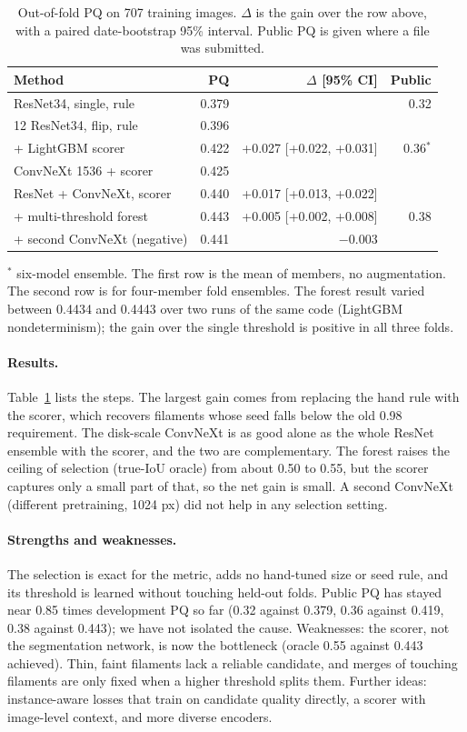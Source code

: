\begin{table}[t]
\caption{Out-of-fold PQ on 707 training images. $\Delta$ is the gain over the row above, with a
paired date-bootstrap 95\% interval. Public PQ is given where a file was submitted.}
\label{tab:results}
\small
\begin{tabular}{@{}p{3.6cm}rrr@{}}
\toprule
Method & PQ & $\Delta$ [95\% CI] & Public \\
\midrule
ResNet34, single, rule & 0.379 & & 0.32 \\
12 ResNet34, flip, rule & 0.396 & & \\
+ LightGBM scorer & 0.422 & +0.027 [+0.022, +0.031] & 0.36$^{\ast}$ \\
ConvNeXt 1536 + scorer & 0.425 & & \\
ResNet + ConvNeXt, scorer & 0.440 & +0.017 [+0.013, +0.022] & \\
+ multi-threshold forest & 0.443 & +0.005 [+0.002, +0.008] & 0.38 \\
\midrule
+ second ConvNeXt (negative) & 0.441 & $-$0.003 & \\
\bottomrule
\end{tabular}

\smallskip
{\footnotesize $^{\ast}$ six-model ensemble. The first row is the mean of members, no augmentation.
The second row is for four-member fold ensembles. The forest result varied between 0.4434 and
0.4443 over two runs of the same code (LightGBM nondeterminism); the gain over the single
threshold is positive in all three folds.}
\end{table}

\paragraph{Results.}
Table~\ref{tab:results} lists the steps. The largest gain comes from replacing the hand rule with
the scorer, which recovers filaments whose seed falls below the old 0.98 requirement. The disk-scale
ConvNeXt is as good alone as the whole ResNet ensemble with the scorer, and the two are
complementary. The forest raises the ceiling of selection (true-IoU oracle) from about 0.50 to 0.55,
but the scorer captures only a small part of that, so the net gain is small. A second ConvNeXt
(different pretraining, 1024 px) did not help in any selection setting.

\paragraph{Strengths and weaknesses.}
The selection is exact for the metric, adds no hand-tuned size or seed rule, and its threshold is
learned without touching held-out folds. Public PQ has stayed near 0.85 times development PQ so far (0.32 against 0.379, 0.36 against 0.419, 0.38 against 0.443);
we have not isolated the cause. Weaknesses: the scorer, not the segmentation
network, is now the bottleneck (oracle 0.55 against 0.443 achieved). Thin, faint filaments lack a
reliable candidate, and merges of touching filaments are only fixed when a higher threshold splits
them. Further ideas: instance-aware losses that train on candidate quality directly, a scorer with
image-level context, and more diverse encoders.
